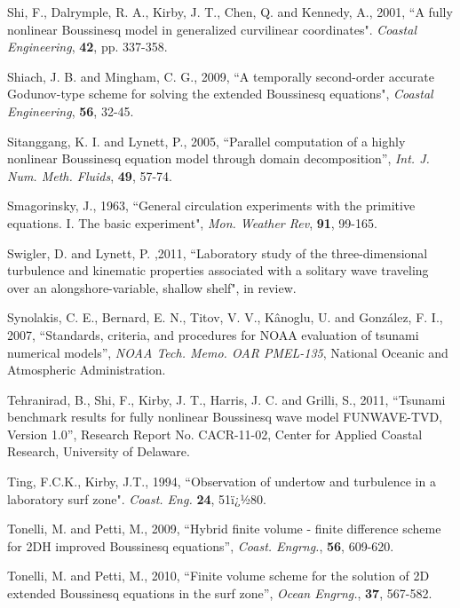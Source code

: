 \documentclass[11pt]{article}
\begin{document}
\begin{description}
\item Shi, F., Dalrymple, R. A., Kirby, J. T., Chen, Q. and Kennedy, A., 2001, ``A fully nonlinear Boussinesq model in generalized curvilinear coordinates". {\em Coastal Engineering}, {\bf 42}, pp. 337-358.

\item Shiach, J. B. and Mingham, C. G., 2009, ``A temporally second-order accurate Godunov-type scheme for solving the extended Boussinesq equations", {\em Coastal Engineering}, {\bf 56}, 32-45.

\item Sitanggang, K. I. and Lynett, P., 2005, ``Parallel computation of a highly nonlinear Boussinesq equation model through domain
decomposition'', {\em Int. J. Num. Meth. Fluids}, {\bf 49}, 57-74.

\item Smagorinsky, J., 1963, ``General circulation experiments with the primitive equations. I. The basic experiment",  {\em Mon. Weather Rev}, {\bf 91}, 99-165.


\item Swigler, D. and Lynett, P. ,2011, ``Laboratory study of the
three-dimensional turbulence and kinematic properties associated with a
solitary wave traveling over an alongshore-variable, shallow shelf",  in
review.

\item Synolakis, C. E., Bernard, E. N., Titov, V. V., K\^{a}noglu, U. and Gonz\'{a}lez, F. I., 2007, ``Standards, criteria, and procedures for NOAA evaluation of tsunami numerical models'', {\em NOAA Tech. Memo. OAR PMEL-135}, National Oceanic and Atmospheric Administration.

\item Tehranirad, B., Shi, F., Kirby, J. T., Harris, J. C. and Grilli, S., 2011, ``Tsunami benchmark results for fully nonlinear Boussinesq wave model FUNWAVE-TVD, Version 1.0'', Research Report No. CACR-11-02, Center for Applied Coastal Research, University of Delaware.  

\item Ting, F.C.K., Kirby, J.T., 1994, ``Observation of undertow and turbulence in a laboratory surf
zone". {\em Coast. Eng.}  {\bf 24}, 51ï¿½80.


\item Tonelli, M. and Petti, M., 2009, ``Hybrid finite volume - finite difference scheme for 2DH improved Boussinesq equations'', {\em Coast. Engrng.}, {\bf 56}, 609-620.

\item Tonelli, M. and Petti, M., 2010, ``Finite volume scheme for the solution of 2D extended Boussinesq equations in the surf zone'', {\em Ocean Engrng.}, {\bf 37}, 567-582.


\end{description}
\end{document}
